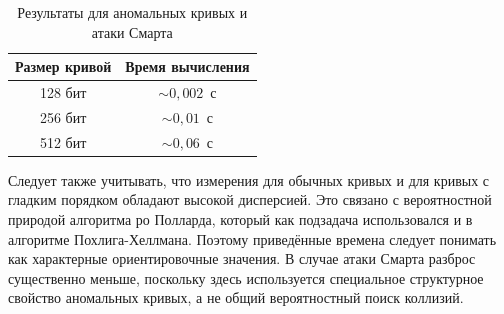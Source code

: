 \begin{table}[htbp]
\centering
\begin{tabular}{|c|c|}
\hline
Размер кривой & Время вычисления \\
\hline
128 бит & $\sim 0{,}002$~с \\
256 бит & $\sim 0{,}01$~с \\
512 бит & $\sim 0{,}06$~с \\
\hline
\end{tabular}
\caption{Результаты для аномальных кривых и атаки Смарта}
\label{tab:smart-attack}
\end{table}

Следует также учитывать, что измерения для обычных кривых и для кривых с гладким порядком обладают высокой дисперсией. Это связано с вероятностной природой алгоритма ро Полларда, который как подзадача использовался и в алгоритме Похлига-Хеллмана. Поэтому приведённые времена следует понимать как характерные ориентировочные значения. В случае атаки Смарта разброс существенно меньше, поскольку здесь используется специальное структурное свойство аномальных кривых, а не общий вероятностный поиск коллизий.
